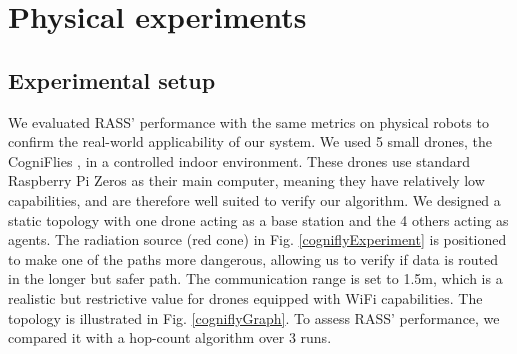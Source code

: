 \section{Physical experiments}
\label{Physical experiments}

\subsection{Experimental setup}
We evaluated \ac{RASS}' performance with the same
metrics on physical robots to confirm the real-world applicability of our system. We used 5 small drones, the CogniFlies \cite{de2021flexible}, in a controlled indoor environment. These drones use standard Raspberry Pi Zeros as their main computer, meaning they have relatively low capabilities, and are therefore well suited to verify our algorithm. We designed a static topology with one drone acting as a base station and the 4 others acting as agents. The radiation source (red cone) in Fig. \ref{cogniflyExperiment} is positioned to make one of the paths more dangerous, allowing us to verify if data is routed in the longer but safer path. The communication range is set to 1.5m, which is a realistic but restrictive value for drones equipped with WiFi capabilities. The topology is illustrated in Fig. \ref{cogniflyGraph}. To assess \ac{RASS}' performance, we compared it with a hop-count algorithm over 3 runs.

